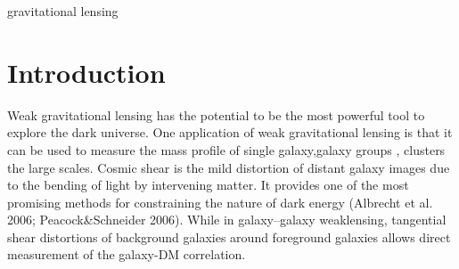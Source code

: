 \documentclass[useAMS,usenatbib]{mn2e}
\begin{document}
\begin{keywords}
  gravitational lensing
\end{keywords}

\setcounter{footnote}{1}




\section{Introduction}

\label{sec:intro}










Weak gravitational lensing has the potential to be the most powerful
tool to explore the dark universe. One application of weak gravitational lensing is
that it can be used to measure the mass profile of single galaxy,galaxy
groups , clusters  the large scales. Cosmic shear is the mild distortion
of distant galaxy images due to the bending of light by intervening
matter. It provides one of the most promising methods for constraining
the nature of dark energy (Albrecht et al. 2006; Peacock\&Schneider
2006). While in galaxy--galaxy weaklensing, tangential shear distortions
of background galaxies around foreground galaxies allows direct measurement
of the galaxy-DM correlation.
\end{document}
